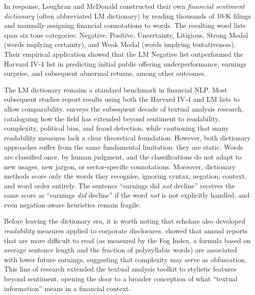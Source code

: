 \begin{context}
In response, Loughran and McDonald constructed their own \emph{financial sentiment
dictionary} (often abbreviated LM dictionary) by reading thousands of 10-K filings and
manually assigning financial connotations to words.  The resulting word lists span six
tone categories: Negative, Positive, Uncertainty, Litigious, Strong Modal (words
implying certainty), and Weak Modal (words implying tentativeness).  Their empirical
application showed that the LM Negative list outperformed the Harvard IV-4 list in
predicting initial public offering underperformance, earnings surprise, and subsequent
abnormal returns, among other outcomes.

The LM dictionary remains a standard benchmark in financial NLP.  Most subsequent
studies report results using both the Harvard IV-4 and LM lists to allow comparability.
\citet{loughran2020textual} surveys the subsequent
decade of textual analysis research, cataloguing how the field has extended beyond
sentiment to readability, complexity, political bias, and fraud detection, while
cautioning that many readability measures lack a clear theoretical foundation.
However, both dictionary approaches suffer from the same fundamental limitation: they are static.  Words are
classified once, by human judgment, and the classifications do not adapt to new usages,
new jargon, or sector-specific connotations.  Moreover, dictionary methods score only
the words they recognise, ignoring syntax, negation, context, and word order entirely.
The sentence ``earnings did \emph{not} decline'' receives the same score as ``earnings
\emph{did} decline'' if the word \emph{not} is not explicitly handled, and even
negation-aware heuristics remain fragile.

Before leaving the dictionary era, it is worth noting that scholars also developed
\emph{readability} measures applied to corporate disclosures.  \citet{li2008annual} %
showed that annual reports that are more difficult to read (as measured by the
Fog Index, a formula based on average sentence length and the fraction of polysyllabic
words) are associated with lower future earnings, suggesting that complexity may serve as
obfuscation.  This line of research extended the textual analysis toolkit to stylistic
features beyond sentiment, opening the door to a broader conception of what ``textual
information'' means in a financial context.


\end{context}
